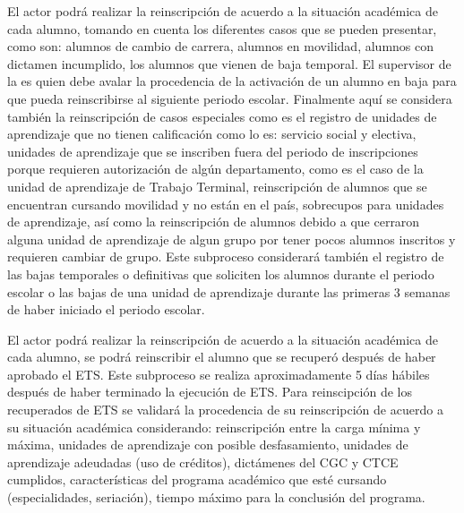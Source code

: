 \begin{PDescripcion}
\begin{enumerate}
		\Ppaso[\PSubProceso]  El actor podrá realizar la reinscripción de acuerdo a la situación académica de cada alumno, tomando en cuenta los diferentes casos que se pueden presentar, como son: alumnos de cambio de carrera, alumnos en movilidad, alumnos con dictamen incumplido, los alumnos que vienen de baja temporal. El supervisor de la  es quien debe avalar la procedencia de la activación de un alumno en baja para que pueda reinscribirse al siguiente periodo escolar. Finalmente aquí se considera también la reinscripción de casos especiales como es el registro de unidades de aprendizaje que no tienen calificación como lo es: servicio social y electiva, unidades de aprendizaje que se inscriben fuera del periodo de inscripciones porque requieren autorización de algún departamento, como es el caso de la unidad de aprendizaje de Trabajo Terminal, reinscripción de alumnos que se encuentran cursando movilidad y no están en el país, sobrecupos para unidades de aprendizaje, así como la reinscripción de alumnos debido a que cerraron alguna unidad de aprendizaje de algun grupo por tener pocos alumnos inscritos y requieren cambiar de grupo. Este subproceso considerará también el registro de las bajas temporales o definitivas que soliciten los alumnos durante el periodo escolar o las bajas de una unidad de aprendizaje durante las primeras 3 semanas de haber iniciado el periodo escolar.
		
		
		
		\Ppaso[\PSubProceso]  El actor podrá realizar la reinscripción de acuerdo a la situación académica de cada alumno, se podrá reinscribir el alumno que se recuperó después de haber aprobado el ETS. Este subproceso se realiza aproximadamente 5 días hábiles después de haber terminado la ejecución de ETS. Para reinscipción de los recuperados de ETS se validará la procedencia de su reinscripción de acuerdo a su situación académica considerando: reinscripción entre la carga mínima y máxima, unidades de aprendizaje con posible desfasamiento, unidades de aprendizaje adeudadas (uso de créditos), dictámenes del CGC y CTCE cumplidos, características del programa académico que esté cursando (especialidades, seriación), tiempo máximo para la conclusión del programa.		
		

\end{enumerate}
\end{PDescripcion}

